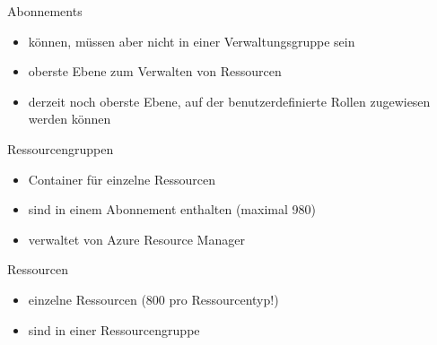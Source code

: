 \begin{flashcard}[Definition]{Abonnements}
  \begin{itemize}
    \item können, müssen aber nicht in einer Verwaltungsgruppe sein
    \item oberste Ebene zum Verwalten von Ressourcen
    \item derzeit noch oberste Ebene, auf der benutzerdefinierte Rollen zugewiesen werden können
  \end{itemize}
\end{flashcard}

\begin{flashcard}[Definition]{Ressourcengruppen}
  \begin{itemize}
    \item Container für einzelne Ressourcen
    \item sind in einem Abonnement enthalten\newline
      (maximal 980)
    \item verwaltet von Azure Resource Manager
  \end{itemize}
\end{flashcard}

\begin{flashcard}[Definition]{Ressourcen}
  \begin{itemize}
    \item einzelne Ressourcen\newline
      (800 pro Ressourcentyp!)
    \item sind in einer Ressourcengruppe
  \end{itemize}
\end{flashcard}


